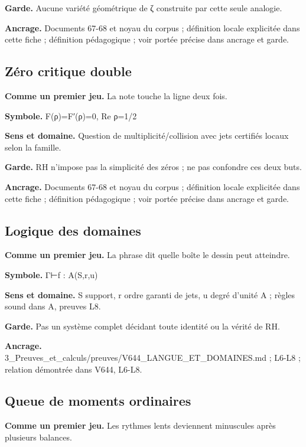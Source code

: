 \documentclass[
  9pt,
  a4paper,
]{article}
\begin{document}
\textbf{Garde.} Aucune variété géométrique de ζ construite par cette
seule analogie.

\textbf{Ancrage.} Documents 67-68 et noyau du corpus ; définition locale
explicitée dans cette fiche ; définition pédagogique ; voir portée
précise dans ancrage et garde.

\hypertarget{zuxe9ro-critique-double}{%
\subsection{Zéro critique double}\label{zuxe9ro-critique-double}}

\textbf{Comme un premier jeu.} La note touche la ligne deux fois.

\textbf{Symbole.} F(ρ)=F′(ρ)=0, Re ρ=1/2

\textbf{Sens et domaine.} Question de multiplicité/collision avec jets
certifiés locaux selon la famille.

\textbf{Garde.} RH n'impose pas la simplicité des zéros ; ne pas
confondre ces deux buts.

\textbf{Ancrage.} Documents 67-68 et noyau du corpus ; définition locale
explicitée dans cette fiche ; définition pédagogique ; voir portée
précise dans ancrage et garde.

\hypertarget{logique-des-domaines}{%
\subsection{Logique des domaines}\label{logique-des-domaines}}

\textbf{Comme un premier jeu.} La phrase dit quelle boîte le dessin peut
atteindre.

\textbf{Symbole.} Γ⊢f : A(S,r,u)

\textbf{Sens et domaine.} S support, r ordre garanti de jets, u degré
d'unité A ; règles sound dans A, preuves L8.

\textbf{Garde.} Pas un système complet décidant toute identité ou la
vérité de RH.

\textbf{Ancrage.}
3\_Preuves\_et\_calculs/preuves/V644\_LANGUE\_ET\_DOMAINES.md ; L6-L8 ;
relation démontrée dans V644, L6-L8.

\hypertarget{queue-de-moments-ordinaires}{%
\subsection{Queue de moments
ordinaires}\label{queue-de-moments-ordinaires}}

\textbf{Comme un premier jeu.} Les rythmes lents deviennent minuscules
après plusieurs balances.
\end{document}
